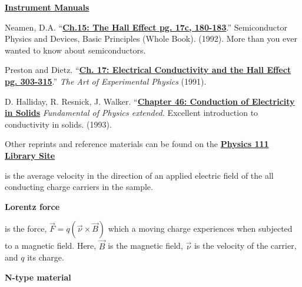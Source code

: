 \documentclass{../lab}
\newcommand{\InstrumentManuals}{http://experimentationlab.berkeley.edu/node/106}
\newcommand{\ChFifteenTheHallEffect}{http://physics111.lib.berkeley.edu/Physics111/Reprints/SHE/09-Semiconductors.pdf}
\newcommand{\ChSeventeenElectricalConductivityandtheHallEffect}{http://physics111.lib.berkeley.edu/Physics111/Reprints/SHE/07-Electrical_Conductivity.pdf}
\newcommand{\ChapterFortySixConductionofElectricity}{http://physics111.lib.berkeley.edu/Physics111/Reprints/SHE/Halliday_Resnick/Ch.\%2046\%20Conduction\%20of\%20electricity\%20in\%20solids.pdf}
\begin{document}
\begin{thebibliography}{}
\label{references}
\href{\InstrumentManuals}{\textbf{Instrument Manuals}}

Neamen, D.A. ``\href{\ChFifteenTheHallEffect}{\textbf{Ch.15: The Hall Effect pg. 17c, 180-183}}.'' Semiconductor Physics and Devices, Basic Principles (Whole Book). (1992). More than you ever wanted to know about semiconductors.

Preston and Dietz. ``\href{\ChSeventeenElectricalConductivityandtheHallEffect}{\textbf{Ch. 17: Electrical Conductivity and the Hall Effect pg. 303-315}}.'' \emph{The Art of Experimental Physics} (1991).

D. Halliday, R. Resnick, J. Walker. ``\href{\ChapterFortySixConductionofElectricity}{\textbf{Chapter 46: Conduction of Electricity in Solids}} \emph{Fundamental of Physics extended.} Excellent introduction to conductivity in solids. (1993).
\end{thebibliography}

\vspace{1em}
\noindent Other reprints and reference materials can be found on the \href{\LabReprints}{\textbf{Physics 111 Library Site}}

is the average velocity in the direction of an applied electric field of the all conducting charge carriers in the sample.

\textbf{Lorentz force}

is the force, $ \vec{F}=q(\vec{\nu}\times\vec{B}) $ which a moving charge experiences when subjected to a magnetic field. Here, $ \vec{B} $ is the magnetic field, $ \vec{\nu} $ is the velocity of the carrier, and $q$ its charge.

\textbf{N-type material}
\end{document}
